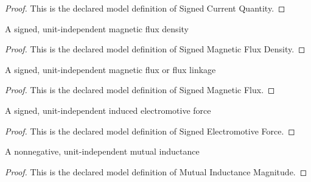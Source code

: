 \begin{proof}
  This is the declared model definition of Signed Current Quantity.
\end{proof}
\begin{definition}
  \label{def:physics:phyx-mini-0978:phyxminiproblems-problemphyxmini0978-signedmagneticfluxdensity}
  A signed, unit-independent magnetic flux density
\end{definition}
\begin{proof}
  This is the declared model definition of Signed Magnetic Flux Density.
\end{proof}
\begin{definition}
  \label{def:physics:phyx-mini-0978:phyxminiproblems-problemphyxmini0978-signedmagneticflux}
  A signed, unit-independent magnetic flux or flux linkage
\end{definition}
\begin{proof}
  This is the declared model definition of Signed Magnetic Flux.
\end{proof}
\begin{definition}
  \label{def:physics:phyx-mini-0978:phyxminiproblems-problemphyxmini0978-signedelectromotiveforce}
  A signed, unit-independent induced electromotive force
\end{definition}
\begin{proof}
  This is the declared model definition of Signed Electromotive Force.
\end{proof}
\begin{definition}
  \label{def:physics:phyx-mini-0978:phyxminiproblems-problemphyxmini0978-mutualinductancemagnitude}
  A nonnegative, unit-independent mutual inductance
\end{definition}
\begin{proof}
  This is the declared model definition of Mutual Inductance Magnitude.
\end{proof}
